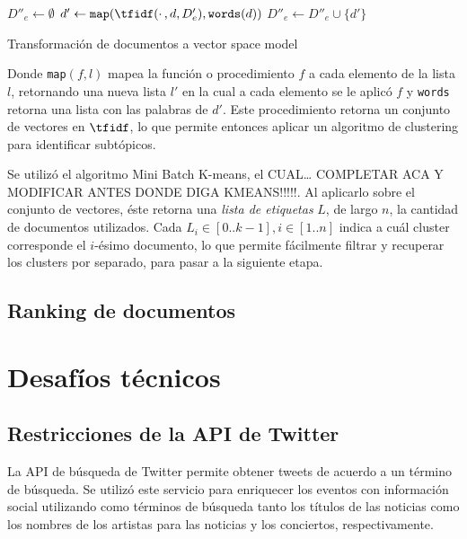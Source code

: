 \documentclass[upright, contnum]{umemoria}
\begin{document}
\begin{algorithm}[H]
$D''_e \leftarrow \emptyset$ \;
 {
   $d' \leftarrow \texttt{map}(\tfidf(\cdotp, d, D'_e), \texttt{words}(d))$\;
}
$D''_e \leftarrow D''_e \cup \{d'\}$\;
\caption{Transformación de documentos a vector space model}
\end{algorithm}

    Donde \texttt{map}$(f,l)$ mapea la
    función o procedimiento $f$ a cada elemento de la lista $l$,
    retornando una nueva lista $l'$ en la cual a cada elemento se le
    aplicó $f$ y \texttt{words} retorna una lista con las palabras de
    $d'$. Este procedimiento retorna un conjunto de vectores en
    $\tfidf$, lo que permite entonces aplicar un algoritmo de
    clustering para identificar subtópicos.

    Se utilizó el algoritmo Mini Batch K-means, el CUAL\ldots{} COMPLETAR
    ACA Y MODIFICAR ANTES DONDE DIGA KMEANS!!!!!. Al aplicarlo sobre
    el conjunto de vectores, éste retorna una \emph{lista de etiquetas}
    $L$, de largo $n$, la cantidad de documentos utilizados. Cada
    $L_i \in [0..k-1], i \in [1..n]$ indica a cuál cluster corresponde
    el $i$-ésimo documento, lo que permite fácilmente filtrar y
    recuperar los clusters por separado, para pasar a la siguiente
    etapa.

\subsection{Ranking de documentos}
\label{sec-4.2.3}

    


\section{Desafíos técnicos}
\label{sec-4.3}

\subsection{Restricciones de la API de Twitter}
\label{sec-4.3.1}


   La API de búsqueda de Twitter permite obtener tweets de acuerdo a un
   término de búsqueda. Se utilizó este servicio para enriquecer los
   eventos con información social utilizando como términos de búsqueda
   tanto los títulos de las noticias como los nombres de los artistas
   para las noticias y los conciertos, respectivamente. 
   
\end{document}
